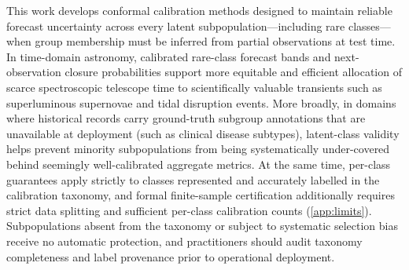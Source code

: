 This work develops conformal calibration methods designed to maintain reliable forecast uncertainty across every latent subpopulation---including rare classes---when group membership must be inferred from partial observations at test time.
In time-domain astronomy, calibrated rare-class forecast bands and next-observation closure probabilities support more equitable and efficient allocation of scarce spectroscopic telescope time to scientifically valuable transients such as superluminous supernovae and tidal disruption events.
More broadly, in domains where historical records carry ground-truth subgroup annotations that are unavailable at deployment (such as clinical disease subtypes), latent-class validity helps prevent minority subpopulations from being systematically under-covered behind seemingly well-calibrated aggregate metrics.
At the same time, per-class guarantees apply strictly to classes represented and accurately labelled in the calibration taxonomy, and formal finite-sample certification additionally requires strict data splitting and sufficient per-class calibration counts (\cref{app:limits}).
Subpopulations absent from the taxonomy or subject to systematic selection bias receive no automatic protection, and practitioners should audit taxonomy completeness and label provenance prior to operational deployment.
